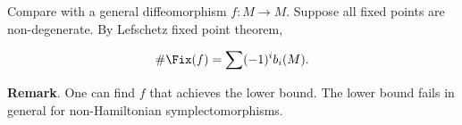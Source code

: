 Compare with a general diffeomorphism $f:M\to M$.
Suppose all fixed points are non-degenerate.
By Lefschetz fixed point theorem,

\begin{framed}
    \missref
\end{framed}

\begin{equation}
    \#\Fix(f) = \sum(-1)^i b_i(M).
\end{equation}

\textbf{Remark}.
\warn
One can find $f$ that achieves the lower bound.
The lower bound fails in general for non-Hamiltonian symplectomorphisms.
